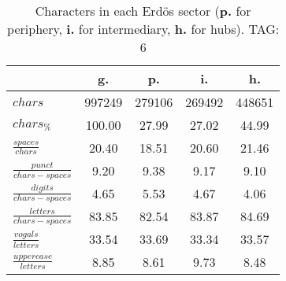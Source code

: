 \begin{table}[h!]
\begin{center}
\begin{tabular}{| l || c | c | c | c |}\hline
 & {\bf g.} & {\bf p.} & {\bf i.} & {\bf h.} \\\hline\hline
$chars$ & 997249  & 279106  & 269492  & 448651 \\
$chars_{\%}$ & 100.00  & 27.99  & 27.02  & 44.99 \\\hline
$\frac{spaces}{chars}$ & 20.40  & 18.51  & 20.60  & 21.46 \\
$\frac{punct}{chars-spaces}$ & 9.20  & 9.38  & 9.17  & 9.10 \\
$\frac{digits}{chars-spaces}$ & 4.65  & 5.53  & 4.67  & 4.06 \\\hline
$\frac{letters}{chars-spaces}$ & 83.85  & 82.54  & 83.87  & 84.69 \\
$\frac{vogals}{letters}$ & 33.54  & 33.69  & 33.34  & 33.57 \\
$\frac{uppercase}{letters}$ & 8.85  & 8.61  & 9.73  & 8.48 \\\hline
\end{tabular}
\caption{Characters in each Erd\"os sector ({{\bf p.}} for periphery, {{\bf i.}} for intermediary, 
    {{\bf h.}} for hubs). TAG: 6}
\end{center}
\end{table}